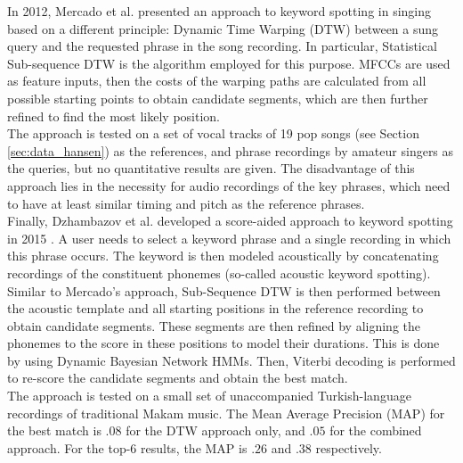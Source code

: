 In 2012, Mercado et al. presented an approach to keyword spotting in singing based on a different principle: Dynamic Time Warping (DTW) between a sung query and the requested phrase in the song recording. In particular, Statistical Sub-sequence DTW is the algorithm employed for this purpose. MFCCs are used as feature inputs, then the costs of the warping paths are calculated from all possible starting points to obtain candidate segments, which are then further refined to find the most likely position.\\
The approach is tested on a set of vocal tracks of 19 pop songs (see Section \ref{sec:data_hansen}) as the references, and phrase recordings by amateur singers as the queries, but no quantitative results are given. The disadvantage of this approach lies in the necessity for audio recordings of the key phrases, which need to have at least similar timing and pitch as the reference phrases.\\

Finally, Dzhambazov et al. developed a score-aided approach to keyword spotting in 2015 \cite{dzhambazov_ismir}. A user needs to select a keyword phrase and a single recording in which this phrase occurs. The keyword is then modeled acoustically by concatenating recordings of the constituent phonemes (so-called acoustic keyword spotting). Similar to Mercado's approach, Sub-Sequence DTW is then performed between the acoustic template and all starting positions in the reference recording to obtain candidate segments. These segments are then refined by aligning the phonemes to the score in these positions to model their durations. This is done by using Dynamic Bayesian Network HMMs. Then, Viterbi decoding is performed to re-score the candidate segments and obtain the best match.\\
The approach is tested on a small set of unaccompanied Turkish-language recordings of traditional Makam music. The Mean Average Precision (MAP) for the best match is $.08$ for the DTW approach only, and $.05$ for the combined approach. For the top-6 results, the MAP is $.26$ and $.38$ respectively.


